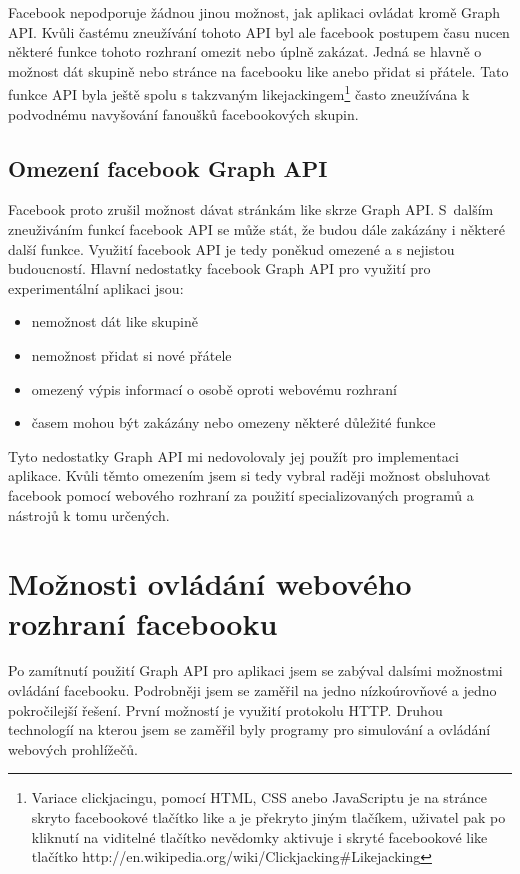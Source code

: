\documentclass[thesis=M,czech]{FITthesis}[2013/05/10]
\begin{document}
Facebook nepodporuje žádnou jinou možnost, jak aplikaci ovládat kromě Graph API. Kvůli častému zneužívání tohoto API byl ale facebook postupem času nucen některé funkce tohoto rozhraní omezit nebo úplně zakázat. Jedná se hlavně o možnost dát skupině nebo stránce na facebooku like anebo přidat si přátele. Tato funkce API byla ještě spolu s takzvaným likejackingem\footnote{Variace clickjacingu, pomocí HTML, CSS anebo JavaScriptu je na stránce skryto facebookové tlačítko like a je překryto jiným tlačíkem, uživatel pak po kliknutí na viditelné tlačítko nevědomky aktivuje i skryté facebookové like tlačítko http://en.wikipedia.org/wiki/Clickjacking\#Likejacking} často zneužívána k podvodnému navyšování fanoušků facebookových skupin. 

\subsection{Omezení facebook Graph API}

Facebook proto zrušil možnost dávat stránkám like skrze Graph API. S~dalším zneuživáním funkcí facebook API se může stát, že budou dále zakázány i některé další funkce. Využití facebook API je tedy poněkud omezené a s nejistou budoucností. Hlavní nedostatky facebook Graph API pro využití pro experimentální aplikaci jsou:

\begin{itemize}
  \item nemožnost dát like skupině
  \item nemožnost přidat si nové přátele
  \item omezený výpis informací o osobě oproti webovému rozhraní
  \item časem mohou být zakázány nebo omezeny některé důležité funkce
\end{itemize}

Tyto nedostatky Graph API mi nedovolovaly jej použít pro implementaci  aplikace. Kvůli těmto omezením jsem si tedy vybral raději možnost obsluhovat facebook pomocí webového rozhraní za použití specializovaných programů a nástrojů k tomu určených.

\section{Možnosti ovládání webového rozhraní facebooku}

Po zamítnutí použití Graph API pro aplikaci jsem se zabýval dalsími možnostmi ovládání facebooku. Podrobněji jsem se zaměřil na jedno nízkoúrovňové a jedno pokročilejší řešení. První možností je využití protokolu HTTP. Druhou technologíí na kterou jsem se zaměřil byly programy pro simulování a ovládání webových prohlížečů.
\end{document}
